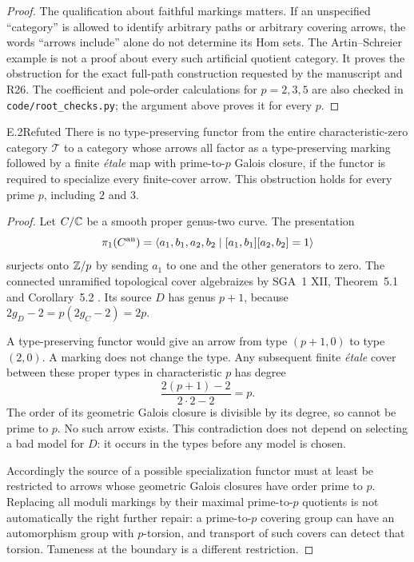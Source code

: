 \begin{proof}
The qualification about faithful markings matters. If an unspecified
``category'' is allowed to identify arbitrary paths or arbitrary
covering arrows, the words ``arrows include'' alone do not determine
its Hom sets. The Artin--Schreier example is not a proof about every
such artificial quotient category. It proves the obstruction for
the exact full-path construction requested by the manuscript and
R26. The coefficient and pole-order calculations for $p=2,3,5$ are
also checked in \texttt{code/root\_checks.py}; the argument above
proves it for every $p$.
\end{proof}

\begin{claim}{E.2}{Refuted}
There is no type-preserving functor from the entire characteristic-zero
category $\mathcal T$ to a category whose arrows all factor as a
type-preserving marking followed by a finite \emph{\'etale} map
with prime-to-$p$ Galois closure, if the functor is required to
specialize every finite-cover arrow. This obstruction holds for
every prime $p$, including $2$ and $3$.
\end{claim}
\begin{proof}
Let $C/\mathbb C$ be a smooth proper genus-two curve. The presentation
\[
\pi_1(C^{\rm an})=
\langle a_1,b_1,a_2,b_2\mid[a_1,b_1][a_2,b_2]=1\rangle
\]
surjects onto $\mathbb Z/p$ by sending $a_1$ to one and the other
generators to zero. The connected unramified topological cover
algebraizes by SGA~1 XII, Theorem~5.1 and Corollary~5.2
\citep{E_SGA1}. Its source $D$ has genus $p+1$, because
$2g_D-2=p(2g_C-2)=2p$.

A type-preserving functor would give an arrow from type $(p+1,0)$
to type $(2,0)$. A marking does not change the type. Any subsequent
finite \emph{\'etale} cover between these proper types in
characteristic $p$ has degree
\[
                  \frac{2(p+1)-2}{2\cdot2-2}=p.
\]
The order of its geometric Galois closure is divisible by its degree,
so cannot be prime to $p$. No such arrow exists. This contradiction
does not depend on selecting a bad model for $D$: it occurs in the
types before any model is chosen.

Accordingly the source of a possible specialization functor must
at least be restricted to arrows whose geometric Galois closures
have order prime to $p$. Replacing all moduli markings by their
maximal prime-to-$p$ quotients is not automatically the right further
repair: a prime-to-$p$ covering group can have an automorphism group
with $p$-torsion, and transport of such covers can detect that
torsion. Tameness at the boundary is a different restriction.
\end{proof}

